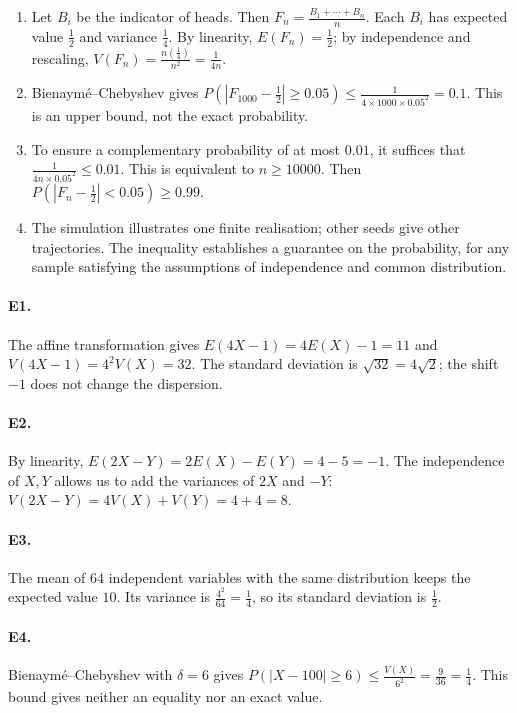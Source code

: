 \begin{enumerate}
\item Let $B_i$ be the indicator of heads. Then $F_n=\frac{B_1+\cdots+B_n}{n}$. Each $B_i$ has expected value $\frac{1}{2}$ and variance $\frac{1}{4}$. By linearity, $E(F_n)=\frac{1}{2}$; by independence and rescaling, $V(F_n)=\frac{n(\frac{1}{4})}{n^2}=\frac{1}{4n}$.
\item Bienaymé--Chebyshev gives $P(|F_{1000}-\frac{1}{2}|\ge0.05)\le\frac{1}{4\times1000\times0.05^2}=0.1$. This is an upper bound, not the exact probability.
\item To ensure a complementary probability of at most $0.01$, it suffices that $\frac{1}{4n\times0.05^2}\le0.01$. This is equivalent to $n\ge10000$. Then $P(|F_n-\frac{1}{2}|<0.05)\ge0.99$.
\item The simulation illustrates one finite realisation; other seeds give other trajectories. The inequality establishes a guarantee on the probability, for any sample satisfying the assumptions of independence and common distribution.
\end{enumerate}

\paragraph{E1.}The affine transformation gives $E(4X-1)=4E(X)-1=11$ and $V(4X-1)=4^2V(X)=32$. The standard deviation is $\sqrt{32}=4\sqrt2$; the shift $-1$ does not change the dispersion.

\paragraph{E2.}By linearity, $E(2X-Y)=2E(X)-E(Y)=4-5=-1$. The independence of $X,Y$ allows us to add the variances of $2X$ and $-Y$: $V(2X-Y)=4V(X)+V(Y)=4+4=8$.

\paragraph{E3.}The mean of $64$ independent variables with the same distribution keeps the expected value $10$. Its variance is $\frac{4^2}{64}=\frac{1}{4}$, so its standard deviation is $\frac{1}{2}$.

\paragraph{E4.}Bienaymé--Chebyshev with $\delta=6$ gives $P(|X-100|\ge6)\le \frac{V(X)}{6^2}=\frac{9}{36}=\frac{1}{4}$. This bound gives neither an equality nor an exact value.

